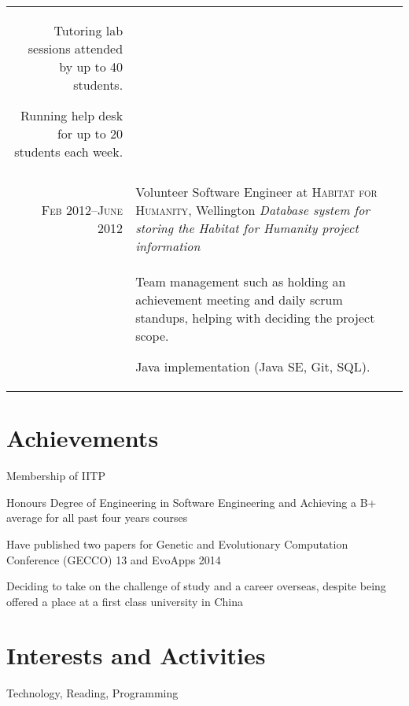 \documentclass[a4paper,10pt]{article} %
\begin{document}
\begin{tabular}{r|p{11cm}}
{Tutoring lab sessions attended by up to 40 students.

Running help desk for up to 20 students each week.
}\\
\multicolumn{2}{c}{} \\


\textsc{Feb 2012–June 2012} & Volunteer Software Engineer at \textsc{Habitat for Humanity}, Wellington
 \emph{Database system for storing the Habitat for Humanity project information}\\
& \footnotesize{

Team management such as holding an achievement meeting and daily scrum standups, helping with deciding the project scope.

Java implementation (Java SE, Git, SQL).

}

\end{tabular}





\section{Achievements}

Membership of IITP

Honours Degree of Engineering in Software Engineering and Achieving a B+ average for all past four years courses

Have published two papers for Genetic and Evolutionary Computation Conference (GECCO) 13 and EvoApps 2014

Deciding to take on the challenge of study and a career overseas, despite being offered a place at a first class university in China


\section{Interests and Activities}
Technology, Reading, Programming
\end{document}
